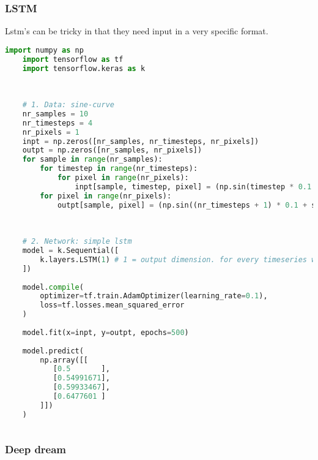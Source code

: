 \subsubsection{LSTM}
Lstm's can be tricky in that they need input in a very specific format.
\begin{lstlisting}[language=python]
    import numpy as np
    import tensorflow as tf
    import tensorflow.keras as k
    
    
    
    # 1. Data: sine-curve
    nr_samples = 10
    nr_timesteps = 4
    nr_pixels = 1
    inpt = np.zeros([nr_samples, nr_timesteps, nr_pixels])
    outpt = np.zeros([nr_samples, nr_pixels])
    for sample in range(nr_samples):
        for timestep in range(nr_timesteps):
            for pixel in range(nr_pixels):
                inpt[sample, timestep, pixel] = (np.sin(timestep * 0.1 + sample) + 1.0) / 2.0
        for pixel in range(nr_pixels):
            outpt[sample, pixel] = (np.sin((nr_timesteps + 1) * 0.1 + sample) + 1.0) / 2.0
        
    
    
    # 2. Network: simple lstm
    model = k.Sequential([
        k.layers.LSTM(1) # 1 = output dimension. for every timeseries we pass in, we want the one next value
    ])
    
    model.compile(
        optimizer=tf.train.AdamOptimizer(learning_rate=0.1),
        loss=tf.losses.mean_squared_error
    )
    
    model.fit(x=inpt, y=outpt, epochs=500)
    
    model.predict(
        np.array([[
           [0.5       ],
           [0.54991671],
           [0.59933467],
           [0.6477601 ]
        ]])
    )
    
\end{lstlisting}


\subsubsection{Deep dream}

